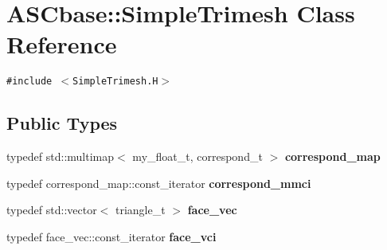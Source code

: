 \section{ASCbase::Simple\-Trimesh Class Reference}
\label{classASCbase_1_1SimpleTrimesh}
{\tt \#include $<$Simple\-Trimesh.H$>$}

\subsection*{Public Types}
\begin{CompactItemize}
\item 
typedef std::multimap$<$ my\_\-float\_\-t, correspond\_\-t $>$ \textbf{correspond\_\-map}\label{classASCbase_1_1SimpleTrimesh_2ca3d7877ebea7cd14caed7b69916786}

\item 
typedef correspond\_\-map::const\_\-iterator \textbf{correspond\_\-mmci}\label{classASCbase_1_1SimpleTrimesh_cf7601a2bd1e9a025743c55b2c41db20}

\item 
typedef std::vector$<$ triangle\_\-t $>$ \textbf{face\_\-vec}\label{classASCbase_1_1SimpleTrimesh_abdd82d831b014f4e94e2af71ab8ae7a}

\item 
typedef face\_\-vec::const\_\-iterator \textbf{face\_\-vci}\label{classASCbase_1_1SimpleTrimesh_b4de70c1cdbd9ce9d95ccf9d0986b7e1}

\end{CompactItemize}
